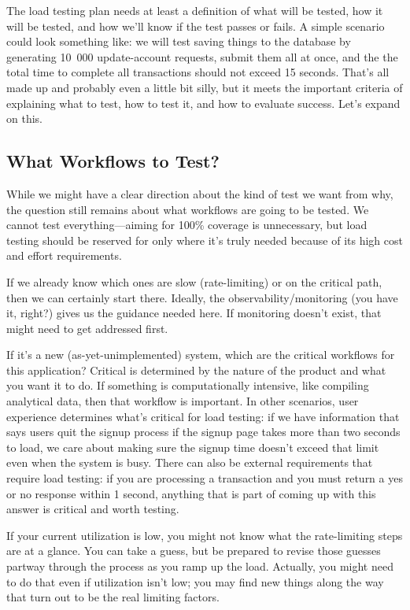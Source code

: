 The load testing plan needs at least a definition of what will be tested, how it will be tested, and how we'll know if the test passes or fails. A simple scenario could look something like: we will test saving things to the database by generating 10~000 update-account requests, submit them all at once, and the the total time to complete all transactions should not exceed 15 seconds. That's all made up and probably even a little bit silly, but it meets the important criteria of explaining what to test, how to test it, and how to evaluate success. Let's expand on this.


\subsection*{What Workflows to Test?}
While we might have a clear direction about the kind of test we want from why, the question still remains about what workflows are going to be tested. We cannot test everything---aiming for 100\% coverage is unnecessary, but load testing should be reserved for only where it's truly needed because of its high cost and effort requirements.

If we already know which ones are slow (rate-limiting) or on the critical path, then we can certainly start there. Ideally, the observability/monitoring  (you have it, right?) gives us the guidance needed here. If monitoring doesn't exist, that might need to get addressed first. 

If it's a new (as-yet-unimplemented) system, which are the critical workflows for this application? Critical is determined by the nature of the product and what you want it to do. If something is computationally intensive, like compiling analytical data, then that workflow is important. In other scenarios, user experience determines what's critical for load testing: if we have information that says users quit the signup process if the signup page takes more than two seconds to load, we care about making sure the signup time doesn't exceed that limit even when the system is busy. There can also be external requirements that require load testing: if you are processing a transaction and you must return a yes or no response within 1 second, anything that is part of coming up with this answer is critical and worth testing.

If your current utilization is low, you might not know what the rate-limiting steps are at a glance. You can take a guess, but be prepared to revise those guesses partway through the process as you ramp up the load. Actually, you might need to do that even if utilization isn't low; you may find new things along the way that turn out to be the real limiting factors. 

